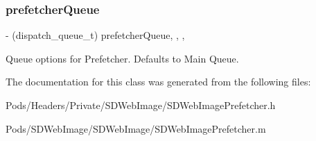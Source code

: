 \subsubsection{\texorpdfstring{prefetcher\+Queue}{prefetcherQueue}}
{\footnotesize\ttfamily -\/ (dispatch\+\_\+queue\+\_\+t) prefetcher\+Queue\hspace{0.3cm}{\ttfamily [read]}, {\ttfamily [write]}, {\ttfamily [nonatomic]}, {\ttfamily [assign]}}

Queue options for Prefetcher. Defaults to Main Queue. 

The documentation for this class was generated from the following files\+:\begin{DoxyCompactItemize}
\item 
Pods/\+Headers/\+Private/\+S\+D\+Web\+Image/S\+D\+Web\+Image\+Prefetcher.\+h\item 
Pods/\+S\+D\+Web\+Image/\+S\+D\+Web\+Image/S\+D\+Web\+Image\+Prefetcher.\+m\end{DoxyCompactItemize}
